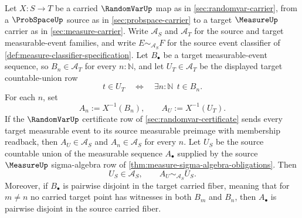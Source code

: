 \begin{theorem}
\label{thm:randomvar-countable-preimage-union-exactness}
Let $X:S\to T$ be a carried $\RandomVarUp$ map as in \autoref{sec:randomvar-carrier}, from a $\ProbSpaceUp$ source as in \autoref{sec:probspace-carrier} to a target $\MeasureUp$ carrier as in \autoref{sec:measure-carrier}. Write $\mathcal{A}_S$ and $\mathcal{A}_T$ for the source and target measurable-event families, and write $E\sim_{\mathcal{A}_S}F$ for the source event classifier of \autoref{def:measure-classifier-specification}. Let $B_\bullet$ be a target measurable-event sequence, so $B_n\in\mathcal{A}_T$ for every $n:\mathbb{N}$, and let $U_T\in\mathcal{A}_T$ be the displayed target countable-union row
$$
t\in U_T\quad\Longleftrightarrow\quad \exists n:\mathbb{N}\ \ t\in B_n.
$$
For each $n$, set
$$
A_n:=X^{-1}(B_n),
\qquad
A_U:=X^{-1}(U_T).
$$
If the $\RandomVarUp$ certificate row of \autoref{sec:randomvar-certificate} sends every target measurable event to its source measurable preimage with membership readback, then $A_U\in\mathcal{A}_S$ and $A_n\in\mathcal{A}_S$ for every $n$. Let $U_S$ be the source countable union of the measurable sequence $A_\bullet$ supplied by the source $\MeasureUp$ sigma-algebra row of \autoref{thm:measure-sigma-algebra-obligations}. Then
$$
U_S\in\mathcal{A}_S,\qquad A_U\sim_{\mathcal{A}_S}U_S.
$$
Moreover, if $B_\bullet$ is pairwise disjoint in the target carried fiber, meaning that for $m\ne n$ no carried target point has witnesses in both $B_m$ and $B_n$, then $A_\bullet$ is pairwise disjoint in the source carried fiber.
\end{theorem}
